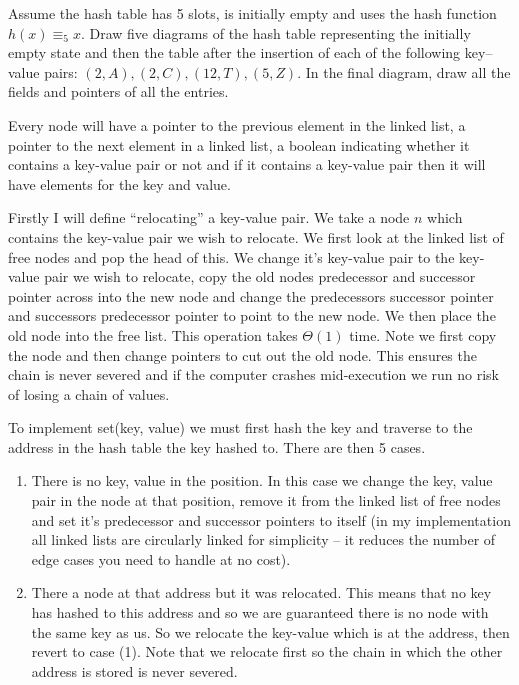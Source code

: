 \documentclass[10pt,\jkfside,a4paper]{article}
\begin{document}
\begin{enumerate}
\begin{enumerate}
Assume the hash table has 5 slots, is initially empty and uses the hash function $h(x) \equiv_5 x$. 
Draw five diagrams of the hash table representing the initially empty state and then the table after 
the insertion of each of the following key–value pairs: $(2, A), (2, C), (12, T), (5, Z)$. In the final 
diagram, draw all the fields and pointers of all the entries.

Every node will have a pointer to the previous element in the linked list, a pointer to the next element in a 
linked list, a boolean indicating whether it contains a key-value pair or not and if it contains a key-value 
pair then it will have elements for the key and value.

Firstly I will define ``relocating'' a key-value pair. We take a node $n$ which contains the key-value pair we 
wish to relocate. We first look at the linked list of free nodes and pop the head of this. We change it's key-value 
pair to the key-value pair we wish to relocate, copy the old nodes predecessor and successor pointer across into the 
new node and change the predecessors successor pointer and successors predecessor pointer to point to the new node. 
We then place the old node into the free list. This operation takes $\Theta(1)$ time. Note we first copy the node 
and then change pointers to cut out the old node. This ensures the chain is never severed and if the computer crashes 
mid-execution we run no risk of losing a chain of values.

To implement set(key, value) we must first hash the key and traverse to the address in the hash table 
the key hashed to. There are then 5 cases.

\begin{enumerate}[label=(\arabic*)]

\item There is no key, value in the position. In this case we change the key, value pair in the node at that position, remove 
it from the linked list of free nodes and set it's predecessor and successor pointers to itself (in my implementation all 
linked lists are circularly linked for simplicity -- it reduces the number of edge cases you need to handle at no cost).

\item There a node at that address but it was relocated. This means that no key has hashed to this address and 
so we are guaranteed there is no node with the same key as us. So we relocate the key-value which is at the address, then revert 
to case (1). Note that we relocate first so the chain in which the other address is stored is never severed.


\end{enumerate}
\end{enumerate}
\end{enumerate}
\end{document}
